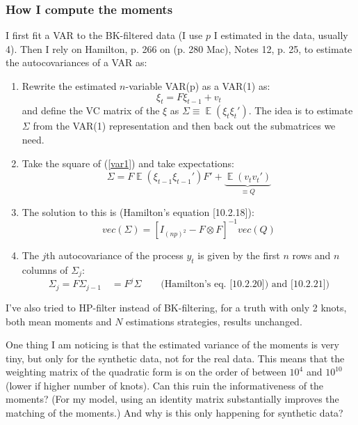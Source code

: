 \documentclass[11pt]{article}
\renewcommand{\[}{\begin{equation}}
\renewcommand{\]}{\end{equation}}
\DeclareMathOperator{\E}{\mathbb{E}}
\begin{document}
\subsubsection{How I compute the moments} 
I first fit a VAR to the BK-filtered data (I use $p$ I estimated in the data, usually 4). Then I rely on Hamilton, p. 266 on (p. 280 Mac), Notes 12, p. 25,  to estimate the autocovariances of a VAR as:
\begin{enumerate}
\item Rewrite the estimated $n$-variable VAR(p) as a VAR(1) as:
\begin{equation}
\xi_t = F\xi_{t-1} + v_t \label{var1}
\end{equation}
and define the VC matrix of the $\xi$ as $\Sigma \equiv \E(\xi_t\xi_t')$. The idea is to estimate $\Sigma$ from the VAR(1) representation and then back out the submatrices we need.
\item Take the square of (\ref{var1}) and take expectations:
\begin{equation}
\Sigma = F\E(\xi_{t-1}\xi_{t-1}')F' + \underbrace{\E(v_tv_t')}_{\equiv Q}
\end{equation}
\item The solution to this is (Hamilton's equation [10.2.18]):
\begin{equation}
vec(\Sigma) = [I_{(np)^2} - F\otimes F]^{-1} vec(Q)
\end{equation}
\item The $j$th autocovariance of the process $y_t$ is given by the first $n$ rows and $n$ columns of $\Sigma_j$:
\begin{equation}
\Sigma_j = F \Sigma_{j-1} \quad = F^j\Sigma \quad \quad \text{(Hamilton's eq. [10.2.20]) and [10.2.21])}
\end{equation}

\end{enumerate}

I've also tried to HP-filter instead of BK-filtering, for a truth with only 2 knots, both  mean moments and $N$ estimations strategies, results unchanged.

One thing I am noticing is that the estimated variance of the moments is very tiny, but only for the synthetic data, not for the real data. This means that the weighting matrix of the quadratic form is on the order of between $10^4$ and $10^{10}$ (lower if higher number of knots). Can this ruin the informativeness of the moments? (For my model, using an identity matrix substantially improves the matching of the moments.) And why is this only happening for synthetic data?
\end{document}
